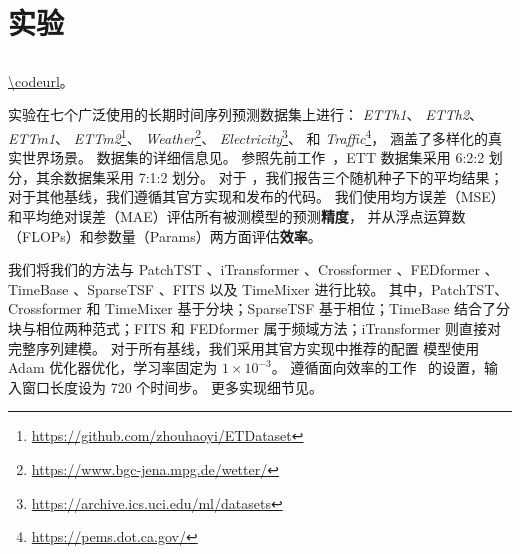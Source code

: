 \section{实验}
\label{sec:exp}


\subsection{}
\label{sec:exp_main}

\url{\codeurl}。

实验在七个广泛使用的长期时间序列预测数据集上进行：
\textit{ETTh1}、
\textit{ETTh2}、
\textit{ETTm1}、
\textit{ETTm2}\footnote{\url{https://github.com/zhouhaoyi/ETDataset}}、
\textit{Weather}\footnote{\url{https://www.bgc-jena.mpg.de/wetter/}}、
\textit{Electricity}\footnote{\url{https://archive.ics.uci.edu/ml/datasets}}、
和 \textit{Traffic}\footnote{\url{https://pems.dot.ca.gov/}}，
涵盖了多样化的真实世界场景。
数据集的详细信息见。
参照先前工作~\citep{nie2023patchtst, zhang2023crossformer, huang2025timebase}，ETT 数据集采用 6:2:2 划分，其余数据集采用 7:1:2 划分。
对于 \blue{\sysplus}，我们报告三个随机种子下的平均结果；对于其他基线，我们遵循其官方实现和发布的代码。
我们使用均方误差（MSE）和平均绝对误差（MAE）评估所有被测模型的预测\textbf{精度}，
并从浮点运算数（FLOPs）和参数量（Params）两方面评估\textbf{效率}。

我们将我们的方法与 PatchTST \citeyearpar{nie2023patchtst}、iTransformer \citeyearpar{liu2023itransformer}、Crossformer \citeyearpar{zhang2023crossformer}、FEDformer \citeyearpar{zhou2022fedformer}、TimeBase \citeyearpar{huang2025timebase}、SparseTSF \citeyearpar{lin2024sparsetsf}、FITS \citeyearpar{fits2024} 以及 TimeMixer \citeyearpar{timemixer24} 进行比较。
其中，PatchTST、Crossformer 和 TimeMixer 基于分块；SparseTSF 基于相位；TimeBase 结合了分块与相位两种范式；FITS 和 FEDformer 属于频域方法；iTransformer 则直接对完整序列建模。
对于所有基线，我们采用其官方实现中推荐的配置
模型使用 Adam 优化器优化，学习率固定为 $1 \times 10^{-3}$。
遵循面向效率的工作~\citep{huang2025timebase, lin2024sparsetsf, fits2024} 的设置，输入窗口长度设为 720 个时间步。
更多实现细节见。

